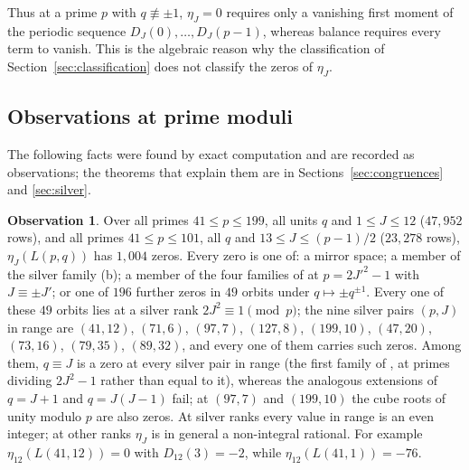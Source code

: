 \documentclass[11pt]{article}
\theoremstyle{definition}
\newtheorem{observation}[theorem]{Observation}
\begin{document}
Thus at a prime $p$ with $q\not\equiv\pm1$, $\eta_J=0$ requires only a
vanishing first moment of the periodic sequence $D_J(0),\ldots,D_J(p-1)$,
whereas balance requires every term to vanish.  This is the algebraic
reason why the classification of Section~\ref{sec:classification} does
not classify the zeros of $\eta_J$.

\subsection{Observations at prime moduli}

The following facts were found by exact computation and are recorded as
observations; the theorems that explain them are in
Sections~\ref{sec:congruences} and \ref{sec:silver}.

\begin{observation}
\label{obs:prime-zeros}
Over all primes $41\leq p\leq199$, all units $q$ and $1\leq J\leq12$
($47{,}952$ rows), and all primes $41\leq p\leq101$, all $q$ and
$13\leq J\leq(p-1)/2$ ($23{,}278$ rows), $\eta_J(L(p,q))$ has $1{,}004$
zeros.  Every zero is one of: a mirror space; a member of the silver family
(b); a member of the four families of \cite[Thm.~7.1]{MahmoodP1Collection2026}
at $p=2J'^2-1$ with $J\equiv\pm J'$; or one of $196$ further zeros in
$49$ orbits under $q\mapsto\pm q^{\pm1}$.  Every one of these $49$ orbits
lies at a silver rank $2J^2\equiv1\pmod p$; the nine silver pairs
$(p,J)$ in range are $(41,12)$, $(71,6)$, $(97,7)$, $(127,8)$, $(199,10)$,
$(47,20)$, $(73,16)$, $(79,35)$, $(89,32)$, and every one of them carries
such zeros.  Among them, $q\equiv J$ is a zero at every silver pair in
range (the first family of \cite{MahmoodP1Collection2026}, at primes
dividing $2J^2-1$ rather than equal to it), whereas the analogous
extensions of $q=J+1$ and $q=J(J-1)$ fail; at $(97,7)$ and $(199,10)$ the
cube roots of unity modulo $p$ are also zeros.  At silver ranks every
value in range is an even integer; at other ranks $\eta_J$ is in general
a non-integral rational.  For example $\eta_{12}(L(41,12))=0$ with
$D_{12}(3)=-2$, while $\eta_{12}(L(41,1))=-76$.
\end{observation}
\end{document}

